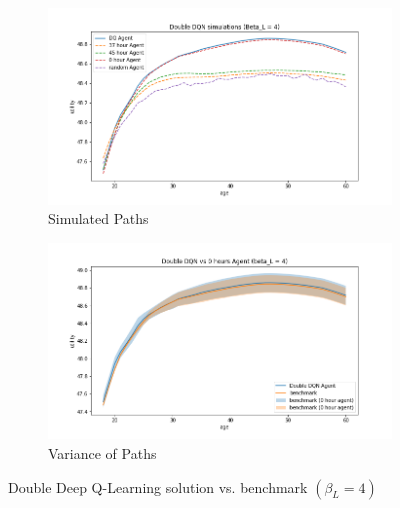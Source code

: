 \begin{figure}[ht]
\begin{subfigure}{.5\textwidth}
  \centering
  \includegraphics[width=1\linewidth]{figures/ddqn_model1_beta_4_solution_benchmark_paths.png}
  \caption{Simulated Paths}
  \label{fig:ddqn_solution_beta4_path}
\end{subfigure}%
\begin{subfigure}{.5\textwidth}
  \centering
  \includegraphics[width=1\linewidth]{figures/ddqn_model1_beta_4_solution_benchmark_variance.png}
  \caption{Variance of Paths}
  \label{fig:ddqn_solution_beta4_var}
\end{subfigure}
    \caption{Double Deep Q-Learning solution vs. benchmark $(\beta_L = 4)$}
    \label{fig:ddqn_solution_beta4}
\end{figure}

